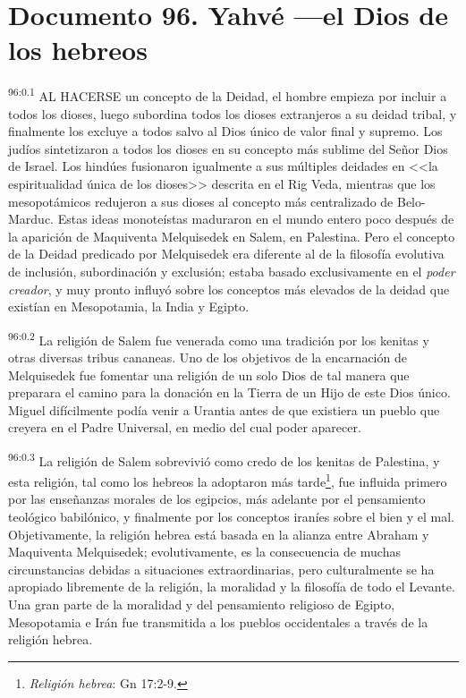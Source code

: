 \chapter{Documento 96. Yahvé ---el Dios de los hebreos}
\par
\textsuperscript{96:0.1} AL HACERSE un concepto de la Deidad, el hombre empieza por incluir a todos los dioses, luego subordina todos los dioses extranjeros a su deidad tribal, y finalmente los excluye a todos salvo al Dios único de valor final y supremo. Los judíos sintetizaron a todos los dioses en su concepto más sublime del Señor Dios de Israel. Los hindúes fusionaron igualmente a sus múltiples deidades en <<la espiritualidad única de los dioses>> descrita en el Rig Veda, mientras que los mesopotámicos redujeron a sus dioses al concepto más centralizado de Belo-Marduc. Estas ideas monoteístas maduraron en el mundo entero poco después de la aparición de Maquiventa Melquisedek en Salem, en Palestina. Pero el concepto de la Deidad predicado por Melquisedek era diferente al de la filosofía evolutiva de inclusión, subordinación y exclusión; estaba basado exclusivamente en el \textit{poder creador}, y muy pronto influyó sobre los conceptos más elevados de la deidad que existían en Mesopotamia, la India y Egipto.

\par
\textsuperscript{96:0.2} La religión de Salem fue venerada como una tradición por los kenitas y otras diversas tribus cananeas. Uno de los objetivos de la encarnación de Melquisedek fue fomentar una religión de un solo Dios de tal manera que preparara el camino para la donación en la Tierra de un Hijo de este Dios único. Miguel difícilmente podía venir a Urantia antes de que existiera un pueblo que creyera en el Padre Universal, en medio del cual poder aparecer.

\par
\textsuperscript{96:0.3} La religión de Salem sobrevivió como credo de los kenitas de Palestina, y esta religión, tal como los hebreos la adoptaron más tarde\footnote{\textit{Religión hebrea}: Gn 17:2-9.}, fue influida primero por las enseñanzas morales de los egipcios, más adelante por el pensamiento teológico babilónico, y finalmente por los conceptos iraníes sobre el bien y el mal. Objetivamente, la religión hebrea está basada en la alianza entre Abraham y Maquiventa Melquisedek; evolutivamente, es la consecuencia de muchas circunstancias debidas a situaciones extraordinarias, pero culturalmente se ha apropiado libremente de la religión, la moralidad y la filosofía de todo el Levante. Una gran parte de la moralidad y del pensamiento religioso de Egipto, Mesopotamia e Irán fue transmitida a los pueblos occidentales a través de la religión hebrea.

